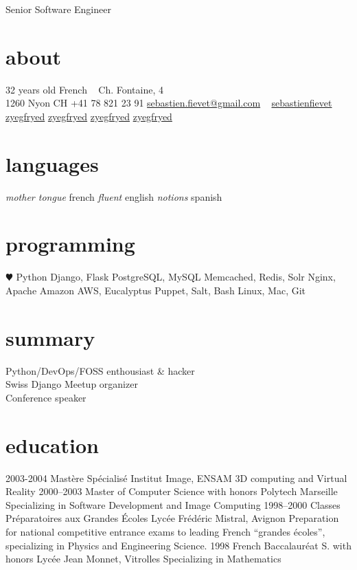 \documentclass[]{friggeri}
\begin{document}
       {Senior Software Engineer}

\begin{aside}
  \section{about}
    {\FA \faUser} 32 years old
    {\FA \faFlag} French
    ~
    {\FA \faHome} Ch. Fontaine, 4\\1260 Nyon CH
    {\FA \faPhone} +41 78 821 23 91
    {\FA \faEnvelope} \href{mailto:sebastien.fievet@gmail.com}{sebastien.fievet@gmail.com}
    ~
    \href{http://www.linkedin.com/in/sebastienfievet}{{\FA \faLinkedin} sebastienfievet}
    ~
    \href{https://twitter.com/zyegfryed}{{\FA \faTwitter} zyegfryed}
    \href{https://github.com/zyegfryed}{{\FA \faGithub} zyegfryed}
    \href{https://bitbucket.org/zyegfryed}{{\FA \faBeaker} zyegfryed}
    \href{https://speakerdeck.com/zyegfryed}{{\FA \faBullhorn} zyegfryed}
  \section{languages}
    \emph{mother tongue} french
    \emph{fluent} english
    \emph{notions} spanish
  \section{programming}
    {\color{red} $\varheartsuit$} Python
    Django, Flask
    PostgreSQL, MySQL
    Memcached, Redis, Solr
    Nginx, Apache
    Amazon AWS, Eucalyptus
    Puppet, Salt, Bash
    Linux, Mac, Git
\end{aside}

\section{summary}

Python/DevOps/FOSS enthousiast \& hacker\\
Swiss Django Meetup organizer\\
Conference speaker

\section{education}

\begin{entrylist}
  \entry
    {2003-2004}
    {Mastère Spécialisé}
    {Institut Image, ENSAM}
    {3D computing and Virtual Reality}
  \entry
    {2000–2003}
    {Master of Computer Science with honors}
    {Polytech Marseille}
    {Specializing in Software Development and Image Computing}
  \entry
    {1998–2000}
    {Classes Préparatoires aux Grandes Écoles}
    {Lycée Frédéric Mistral, Avignon}
    {Preparation for national competitive entrance exams to leading French ``grandes écoles'', specializing in Physics and Engineering Science.}
  \entry
    {1998}
    {French Baccalauréat S. with honors}
    {Lycée Jean Monnet, Vitrolles}
    {Specializing in Mathematics}
\end{entrylist}
\end{document}
